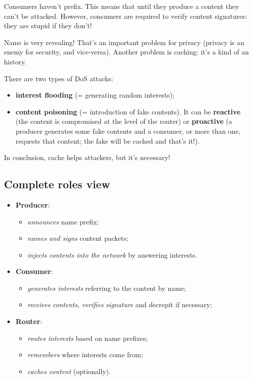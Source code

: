 Consumers haven't prefix. This means that until they produce a content they
can't be attacked. However, consumers are required to verify content
signatures: they are stupid if they don't!

Name is very revealing! That's an important problem for privacy (privacy is an
enemy for security, and vice-versa). Another problem is caching: it's a kind of
an history.

There are two types of DoS attacks:
\begin{itemize}
  \item \textbf{interest flooding} (= generating random interests);
  \item \textbf{content poisoning} (= introduction of fake contents). It can be
\textbf{reactive} (the content is compromised at the level of the router) or
\textbf{proactive} (a producer generates some fake contents and a consumer, or
more than one, requests that content; the fake will be cached and that's it!).
\end{itemize}
In conclusion, cache helps attackers, but it's necessary!

\subsection{Complete roles view}
\begin{itemize}
  \item \textbf{Producer}:
  \begin{itemize}
    \item \textit{announces} name prefix;
    \item \textit{names and signs} content packets;
    \item \textit{injects contents into the network} by answering interests.
  \end{itemize}
  \item \textbf{Consumer}:
  \begin{itemize}
    \item \textit{generates interests} referring to the content by name;
    \item \textit{receives contents, verifies signature} and decrepit if
necessary;
  \end{itemize}
  \item \textbf{Router}:
  \begin{itemize}
    \item \textit{routes interests} based on name prefixes;
    \item \textit{remembers} where interests come from;
    \item \textit{caches content} (optionally).
  \end{itemize}
\end{itemize}
